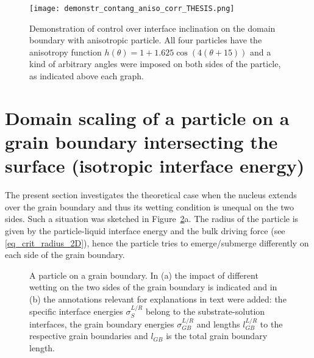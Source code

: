 	\begin{figure}
		\centering
		\texttt{[image: demonstr\_contang\_aniso\_corr\_THESIS.png]}
		\caption[Demonstration of control over interface inclination on the domain boundary with anisotropic particle.]{Demonstration of control over interface inclination on the domain boundary with anisotropic particle. All four particles have the anisotropy function $h(\theta)=1+1.625\cos(4(\theta+15))$ and a kind of arbitrary angles were imposed on both sides of the particle, as indicated above each graph.}
		\label{fig_demo_aniso_paticle_contangs_controlled}
	\end{figure}
		

\section{Domain scaling of a particle on a grain boundary intersecting the surface (isotropic interface energy)}
The present section investigates the theoretical case when the nucleus extends over the grain boundary and thus its wetting condition is unequal on the two sides. Such a situation was sketched in Figure~\ref{fig_sketch_particle_onGB}a. The radius of the particle is given by the particle-liquid interface energy and the bulk driving force (see \eqref{eq_crit_radius_2D}), hence the particle tries to emerge/submerge differently on each side of the grain boundary.

\begin{figure}
	\centering
	\caption[Sketch - a particle on a grain boundary]{A particle on a grain boundary. In (a) the impact of different wetting on the two sides of the grain boundary is indicated and in (b) the annotations relevant for explanations in text were added: the specific interface energies $\sigma_S^{L/R}$ belong to the substrate-solution interfaces, the grain boundary energies $\sigma_{GB}^{L/R}$ and lengths $l_{GB}^{L/R}$ to the respective grain boundaries and $l_{GB}$ is the total grain boundary length.}
	\label{fig_sketch_particle_onGB}
\end{figure}

